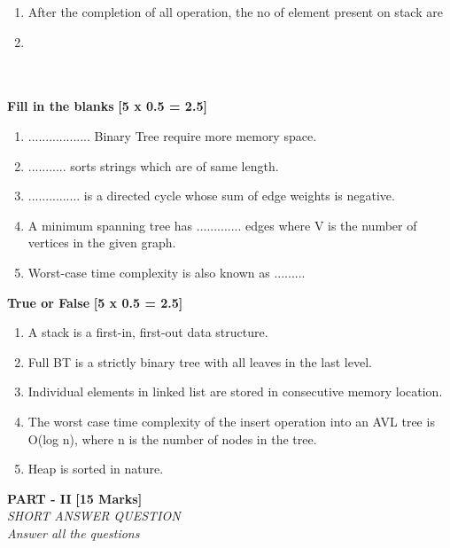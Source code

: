 \documentclass[12pt ,a4paper]{exam}
\begin{document}
\begin{enumerate}[start=1,label={\bfseries Q\arabic*)}]
    \item []After the completion of all operation, the no of element present on stack are
    \item[]   
    \begin{oneparchoices}
    	\\%
    	\\
    	\\
    \end{oneparchoices}
 
    \end{enumerate}
	
	\noindent \textbf{Fill in the blanks} \hfill\textbf{ [5 x 0.5 = 2.5]}
	
	\begin{enumerate}[start=11,label={\bfseries Q\arabic*)}]
		\item   .................. Binary Tree require more memory space.
		\item ........... sorts strings which are  of same length.
		\item ...............  is a directed cycle whose sum of edge weights is negative.
		\item A minimum spanning tree has ............. edges where V is the number of vertices in the given graph.
		\item Worst-case time complexity is also known as .........
	\end{enumerate}
	
	\noindent \textbf{True or False} \hfill\textbf{ [5 x 0.5 = 2.5]}
	
	\begin{enumerate}[start=16,label={\bfseries Q\arabic*)}]
		\item A stack is a first-in, first-out data structure.
		\item Full BT is a strictly binary tree with all leaves in the last level.
		\item Individual elements in linked list are stored in consecutive memory location.
		\item The worst case time complexity of the insert operation into an AVL tree is O(log n), where n is the number of nodes in the tree.
		\item Heap is sorted in nature.
		
	\end{enumerate}
	\vspace{0.1mm}
	\pagebreak
	\begin{center}
		\textbf{PART - II} \textbf{[15 Marks]}\\
		\noindent \textit{SHORT ANSWER QUESTION} \\
		\noindent \textit{Answer all the questions} 
	\end{center}
\end{document}

